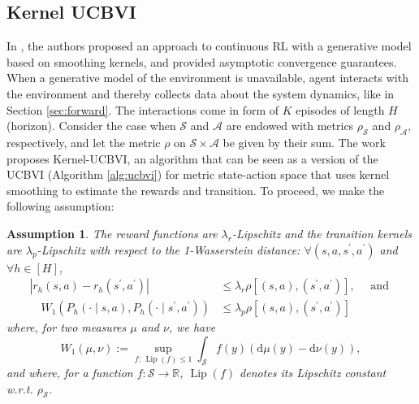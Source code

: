 \documentclass{article}
\numberwithin{equation}{section}
\newtheorem{assumption}{Assumption}
\newcommand{\cA}{\mathcal{A}}
\newcommand{\cS}{\mathcal{S}}
\begin{document}
\subsection{Kernel UCBVI}
In \citep{ormoneit2002kernel}, the authors proposed an approach to continuous RL with a generative model based on smoothing kernels, and provided asymptotic convergence guarantees.
When a generative model of the environment is unavailable, agent interacts with the environment and thereby collects data about the system dynamics, like in Section \ref{sec:forward}. The interactions come in form of \(K\) episodes of length \(H\) (horizon).
Consider the case when $\cS$ and \(\cA\) are endowed with metrics \(\rho_{\cS} \) and \( \rho_{\cA} \), respectively, and let the metric \(\rho\) on \(\cS \times \cA \) be given by their sum.
The work \citep{domingues2021kernel} proposes Kernel-UCBVI, an algorithm that can be seen as a version of the UCBVI (Algorithm \eqref{alg:ucbvi}) for metric state-action space that uses kernel smoothing to estimate the rewards and transition. To proceed, we make the following assumption:
\begin{assumption}\label{asm:lip_mdp}
    The reward functions are $\lambda_r$-Lipschitz and the transition kernels are $\lambda_p$-Lipschitz with respect to the 1-Wasserstein distance: $\forall\left(s, a, s^{\prime}, a^{\prime}\right)$ and $\forall h \in[H]$,
    $$
    \begin{aligned}
    \left|r_h(s, a)-r_h\left(s^{\prime}, a^{\prime}\right)\right| & \leq \lambda_r \rho\left[(s, a),\left(s^{\prime}, a^{\prime}\right)\right], \quad \text { and } \\
    \quad W_1\left(P_h(\cdot \mid s, a), P_h\left(\cdot \mid s^{\prime}, a^{\prime}\right)\right) & \leq \lambda_p \rho\left[(s, a),\left(s^{\prime}, a^{\prime}\right)\right]
    \end{aligned}
    $$
    where, for two measures $\mu$ and $\nu$, we have
    $$
    W_1(\mu, \nu) := \sup _{f:\, \operatorname{Lip}(f) \leq 1} \int_{\cS} f(y)(\mathrm{d} \mu(y)-\mathrm{d} \nu(y)),
    $$
    and where, for a function $f: \cS \rightarrow \mathbb{R}$, $\operatorname{Lip}(f)$ denotes its Lipschitz constant w.r.t. $\rho_{\cS}$.
\end{assumption}
\end{document}
